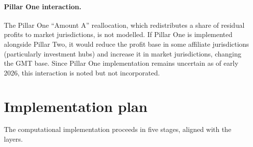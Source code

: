 \documentclass[11pt,a4paper]{article}
\begin{document}
\paragraph{Pillar One interaction.} The Pillar One ``Amount A'' reallocation, which redistributes a share of residual profits to market jurisdictions, is not modelled. If Pillar One is implemented alongside Pillar Two, it would reduce the profit base in some affiliate jurisdictions (particularly investment hubs) and increase it in market jurisdictions, changing the GMT base. Since Pillar One implementation remains uncertain as of early 2026, this interaction is noted but not incorporated.

\section{Implementation plan}\label{sec:implementation}

The computational implementation proceeds in five stages, aligned with the layers.
\end{document}
